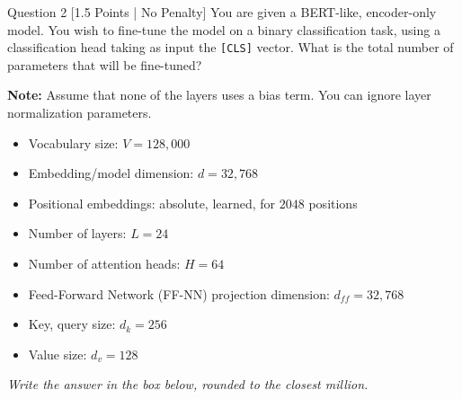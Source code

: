 \documentclass[11pt,a4paper]{article}
\begin{document}
\begin{questionbox}{Question 2 \hfill [1.5 Points | No Penalty]}
You are given a BERT-like, encoder-only model. You wish to fine-tune the model on a binary classification task, using a classification head taking as input the \texttt{[CLS]} vector. What is the total number of parameters that will be fine-tuned?

\medskip\noindent
\textbf{Note:} Assume that none of the layers uses a bias term. You can ignore layer normalization parameters.
\begin{itemize}[leftmargin=2em,itemsep=1pt]
    \item Vocabulary size: $V = 128{,}000$
    \item Embedding/model dimension: $d = 32{,}768$
    \item Positional embeddings: absolute, learned, for $2048$ positions
    \item Number of layers: $L = 24$
    \item Number of attention heads: $H = 64$
    \item Feed-Forward Network (FF-NN) projection dimension: $d_{ff} = 32{,}768$
    \item Key, query size: $d_k = 256$
    \item Value size: $d_v = 128$
\end{itemize}
\medskip
\textit{Write the answer in the box below, rounded to the closest million.}
\end{questionbox}

\vspace{0.3cm}
\end{document}
